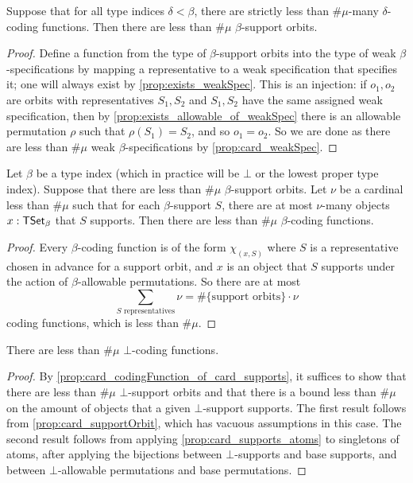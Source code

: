 \begin{proposition}
  \label{prop:card_supportOrbit}
  Suppose that for all type indices \( \delta < \beta \), there are strictly less than \( \#\mu \)-many \( \delta \)-coding functions.
  Then there are less than \( \#\mu \) \( \beta \)-support orbits.
\end{proposition}
\begin{proof}
  Define a function from the type of \( \beta \)-support orbits into the type of weak \( \beta \)-specifications by mapping a representative to a weak specification that specifies it; one will always exist by \cref{prop:exists_weakSpec}.
  This is an injection: if \( o_1, o_2 \) are orbits with representatives \( S_1, S_2 \) and \( S_1, S_2 \) have the same assigned weak specification, then by \cref{prop:exists_allowable_of_weakSpec} there is an allowable permutation \( \rho \) such that \( \rho(S_1) = S_2 \), and so \( o_1 = o_2 \).
  So we are done as there are less than \( \#\mu \) weak \( \beta \)-specifications by \cref{prop:card_weakSpec}.
\end{proof}
\begin{proposition}
  \label{prop:card_codingFunction_of_card_supports}
  Let \( \beta \) be a type index (which in practice will be \( \bot \) or the lowest proper type index).
  Suppose that there are less than \( \#\mu \) \( \beta \)-support orbits.
  Let \( \nu \) be a cardinal less than \( \#\mu \) such that for each \( \beta \)-support \( S \), there are at most \( \nu \)-many objects \( x : \mathsf{TSet}_\beta \) that \( S \) supports.
  Then there are less than \( \#\mu \) \( \beta \)-coding functions.
\end{proposition}
\begin{proof}
  Every \( \beta \)-coding function is of the form \( \chi_{(x, S)} \) where \( S \) is a representative chosen in advance for a support orbit, and \( x \) is an object that \( S \) supports under the action of \( \beta \)-allowable permutations.
  So there are at most
  \[ \sum_{S \text{ representatives}} \nu = \#\{\text{support orbits}\} \cdot \nu \]
  coding functions, which is less than \( \#\mu \).
\end{proof}
\begin{proposition}
  \label{prop:card_codingFunction_bot}
  There are less than \( \#\mu \) \( \bot \)-coding functions.
\end{proposition}
\begin{proof}
  By \cref{prop:card_codingFunction_of_card_supports}, it suffices to show that there are less than \( \#\mu \) \( \bot \)-support orbits and that there is a bound less than \( \#\mu \) on the amount of objects that a given \( \bot \)-support supports.
  The first result follows from \cref{prop:card_supportOrbit}, which has vacuous assumptions in this case.
  The second result follows from applying \cref{prop:card_supports_atoms} to singletons of atoms, after applying the bijections between \( \bot \)-supports and base supports, and between \( \bot \)-allowable permutations and base permutations.
\end{proof}

